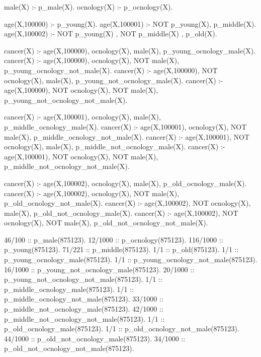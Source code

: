 \documentclass[german,version-2020-11]{uzl-thesis}
\begin{document}
\newpage
\begin{Pseudocode} [caption={\textit{beliefProgram.pbl} für Krebs in eICU}, label={code:beliefprogrameicu}, numbers=left]
male(X) :- p_male(X). 
ocnology(X) :- p_ocnology(X).

age(X,100000) :- p_young(X).
age(X,100001) :- NOT p_young(X), p_middle(X).
age(X,100002) :- NOT p_young(X) , NOT p_middle(X) , p_old(X).

cancer(X) :- age(X,100000), ocnology(X), male(X), p_young_ocnology_male(X).
cancer(X) :- age(X,100000), ocnology(X), NOT male(X), p_young_ocnology_not_male(X).
cancer(X) :- age(X,100000), NOT ocnology(X), male(X), p_young_not_ocnology_male(X).
cancer(X) :- age(X,100000), NOT ocnology(X), NOT male(X), p_young_not_ocnology_not_male(X).

cancer(X) :- age(X,100001), ocnology(X), male(X), p_middle_ocnology_male(X).
cancer(X) :- age(X,100001), ocnology(X), NOT male(X), p_middle_ocnology_not_male(X).
cancer(X) :- age(X,100001), NOT ocnology(X), male(X), p_middle_not_ocnology_male(X).
cancer(X) :- age(X,100001), NOT ocnology(X), NOT male(X), p_middle_not_ocnology_not_male(X).

cancer(X) :- age(X,100002), ocnology(X), male(X), p_old_ocnology_male(X).
cancer(X) :- age(X,100002), ocnology(X), NOT male(X), p_old_ocnology_not_male(X).
cancer(X) :- age(X,100002), NOT ocnology(X), male(X), p_old_not_ocnology_male(X).
cancer(X) :- age(X,100002), NOT ocnology(X), NOT male(X), p_old_not_ocnology_not_male(X).

46/100 :: p_male(875123).
12/1000 :: p_ocnology(875123).
116/1000 :: p_young(875123).
71/221 :: p_middle(875123).
1/1 :: p_old(875123).
1/1 :: p_young_ocnology_male(875123).
1/1 :: p_young_ocnology_not_male(875123).
16/1000 :: p_young_not_ocnology_male(875123).
20/1000 :: p_young_not_ocnology_not_male(875123).
1/1 :: p_middle_ocnology_male(875123).
1/1 :: p_middle_ocnology_not_male(875123).
33/1000 :: p_middle_not_ocnology_male(875123).
42/1000 :: p_middle_not_ocnology_not_male(875123).
1/1 :: p_old_ocnology_male(875123).
1/1 :: p_old_ocnology_not_male(875123).
44/1000 :: p_old_not_ocnology_male(875123).
34/1000 :: p_old_not_ocnology_not_male(875123).
\end{Pseudocode}
\end{document}
